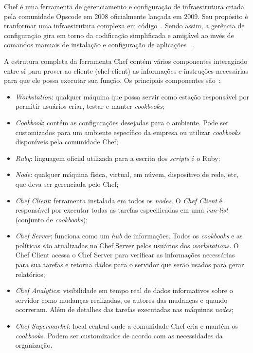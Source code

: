Chef é uma ferramenta de gerenciamento e configuração de infraestrutura criada
pela comunidade Opscode em 2008 oficialmente lançada em 2009. Seu propósito é
tranformar uma infraestrutura complexa em código~\cite{chef:2016}. Sendo assim, a gerência de
configuração gira em torno da codificação simplificada e amigável
ao invés de comandos manuais de instalação e configuração de aplicações ~\cite{sharma:2015}.

A estrutura completa da ferramenta Chef contém vários componentes interagindo entre si para
prover ao cliente (chef-client) as informações e instruções necessárias para que ele
possa executar sua função. Os principais componentes são~\cite{chefdoc:2016}:

\begin{itemize}
  \item \textit{Workstation}: qualquer máquina que possa servir como estação
    responsável por permitir usuários criar, testar e manter \textit{cookbooks};
  \item \textit{Cookbook}: contém as configurações desejadas para o ambiente.
    Pode ser customizados para um ambiente específico da empresa ou utilizar
    \textit{cookbooks} disponíveis pela comunidade Chef;
  \item \textit{Ruby}: linguagem oficial utilizada para a escrita dos \textit{scripts}
    é o Ruby;
  \item \textit{Node}: qualquer máquina física, virtual, em núvem, dispositivo
    de rede, etc, que deva ser gerenciada pelo Chef;
  \item \textit{Chef Client}: ferramenta instalada em todos os \textit{nodes}. O
    \textit{Chef Client} é responsável por executar todas as tarefas especificadas
    em uma \textit{run-list} (conjunto de \textit{cookbooks});
  \item \textit{Chef Server}: funciona como um \textit{hub} de informações. Todos os
    \textit{cookbooks} e as políticas são atualizadas no Chef Server pelos usuários
    dos \textit{workstations}. O Chef Client acessa o Chef Server para verificar
    as informações necessárias para sua tarefas e retorna dados para o servidor
    que serão usados para gerar relatórios;
  \item \textit{Chef Analytics}: visibilidade em tempo real de dados informativos
    sobre o servidor como mudanças realizadas, os autores das mudanças e quando
    ocorreram. Além de detalhes das tarefas executadas nas máquinas \textit{nodes};
  \item \textit{Chef Supermarket}: local central onde a comunidade Chef cria e
    mantém os \textit{cookbooks}. Podem ser customizados de acordo com as necessidades
    da organização.
\end{itemize}

